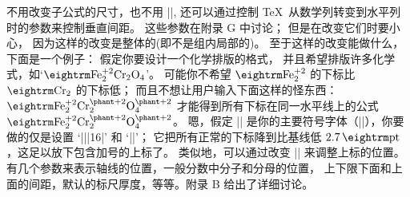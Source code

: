 \ddanger 不用改变子公式的尺寸，也不用 |\raise|,
还可以通过控制 \TeX\ 从数学列转变到水平列时的参数来控制垂直间距。%
这些参数在附录 G 中讨论；
但是在改变它们时要小心，
因为这样的改变是整体的(即不是组内局部的)。%
至于这样的改变能做什么，下面是一个例子：
假定你要设计一个化学排版的格式，
并且希望排版许多化学式，如`$\rm Fe_2^{+2}Cr_2O_4$'。%
可能你不希望 $\rm Fe_2^{+2}$ 的下标比 $\rm Cr_2$ 的下标低；
而且不想让用户输入下面这样的怪东西：
\begintt
$\rm Fe_2^{+2}Cr_2^{\vphantom{+2}}O_4^{\vphantom{+2}}$
\endtt
才能得到所有下标在同一水平线上的公式
$\rm Fe_2^{+2}Cr_2^{\vphantom{+2}}O_4^{\vphantom{+2}}$。
嗯，假定 |\tensy| 是你的主要符号字体（||），你要做的仅是设置
`|\fontdimen||16\tensy=2.7pt|' 和 `|\tensy=2.7pt|'；
它把所有正常的下标降到比基线低 $2.7\pt$，这足以放下包含加号的上标了。
类似地，可以通过改变 |\tensy| 来调整上标的位置。
有几个参数来表示轴线的位置，一般分数中分子和分母的位置，
上下限下面和上面的间距，默认的标尺厚度，等等。附录 B 给出了详细讨论。


